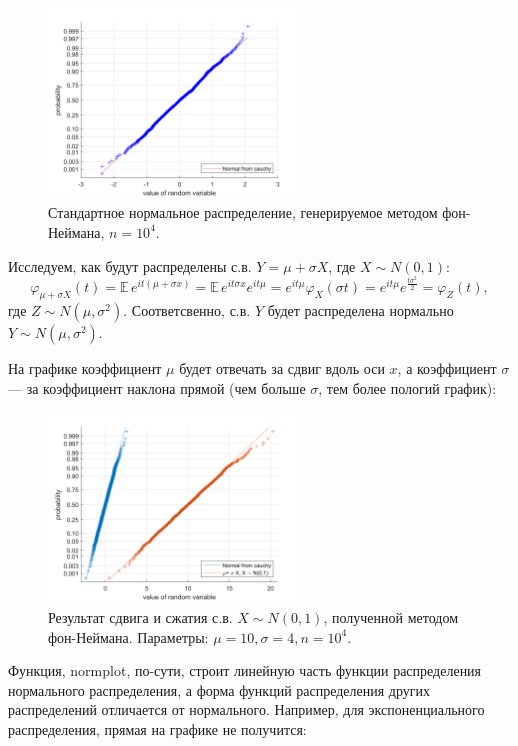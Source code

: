 \documentclass[oneside, final, 12pt]{article}
\def\E{{\mathbb{E} }\,}
\begin{document}
	\begin{figure}[h!]
		\centering
		\includegraphics[width=0.6\textwidth]{../code/Task_4/pict/norm_ex.png}
		\caption{Стандартное нормальное распределение, генерируемое методом фон-Неймана, $n=10^4.$}
    \end{figure}	

	Исследуем, как будут распределены с.в. $Y=\mu+\sigma X$, где $X\sim N(0,1)$:
	$$
		\varphi_{\mu+\sigma X}(t) = \E e^{it(\mu+\sigma x)} = \E e^{it\sigma x}e^{it\mu} =
		e^{it\mu} \varphi_X(\sigma t) = e^{it\mu} e^{\frac{t\sigma^2}{2}} =\varphi_Z(t), 
	$$
	где $Z\sim N(\mu, \sigma^2).$ Соответсвенно, с.в. $Y$ будет распределена нормально 
	$Y\sim  N(\mu, \sigma^2)$. 

	\newpage 
		На графике коэффициент $\mu$ будет отвечать за сдвиг вдоль оси $x$, а 
	коэффициент $\sigma$ --- за коэффициент наклона прямой (чем больше $\sigma$, тем более пологий
	график):
	\begin{figure}[h!]
		\centering
		\includegraphics[width=0.6\textwidth]{../code/Task_4/pict/norm_2_ex.png}
		\caption{ \centering Результат сдвига и сжатия с.в. $X\sim N(0,1)$, полученной методом фон-Неймана. 
						 \newline Параметры: $\mu =10, \sigma =4,  n=10^4.$ }
    \end{figure}
	
	Функция, normplot, по-сути, строит линейную часть функции распределения нормального распределения, а 
	форма функций распределения других распределений отличается от нормального. Например, для
	экспоненциального распределения, прямая на графике не получится:
\end{document}
